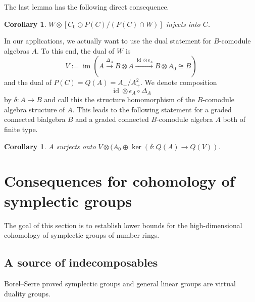 \documentclass[11pt,letterpaper]{amsart}
\numberwithin{theoremcounter}{section}
\newtheorem{corollary}[corollaryauto]{Corollary}
\theoremstyle{definition}
\theoremstyle{remark}
\DeclareMathOperator{\id}{id}
\DeclareMathOperator{\im}{im}
\begin{document}
The last lemma has the following direct consequence.

\begin{corollary}
    $W \otimes [C_0 \oplus P(C)/(P(C) \cap W)]$ injects into $C$.
\end{corollary}

In our applications, we actually want to use the dual statement for $B$-comodule algebras $A$. To this end, the dual of $W$ is
\[ V := \im( A \stackrel{\Delta_A}{\longrightarrow} B \otimes A \stackrel{\id \otimes \epsilon_A}{\longrightarrow} B \otimes A_0 \cong B)\]
and the dual of $P(C) = Q(A) = A_+/A^2_+$. We denote composition $$ \id \otimes \epsilon_A \circ  \Delta_A$$ by $\delta:A\to B$ and call this the structure homomorphism of the $B$-comodule algebra structure of $A$. This leads to the following statement for a graded connected bialgebra $B$ and a graded connected $B$-comodule algebra $A$ both of finite type. 

\begin{corollary} \label{ComoduleAlgFree}
    $A$ surjects onto $V \otimes (A_0 \oplus \ker(\delta \colon Q(A) \to Q(V))$.
\end{corollary}

\section{Consequences for cohomology of symplectic groups} \label{ApSm}

The goal of this section is to establish lower bounds for the high-dimensional cohomology of symplectic groups of number rings.

\subsection{A source of  indecomposables}

Borel--Serre proved symplectic groups and general linear groups are virtual duality groups. 
\end{document}
